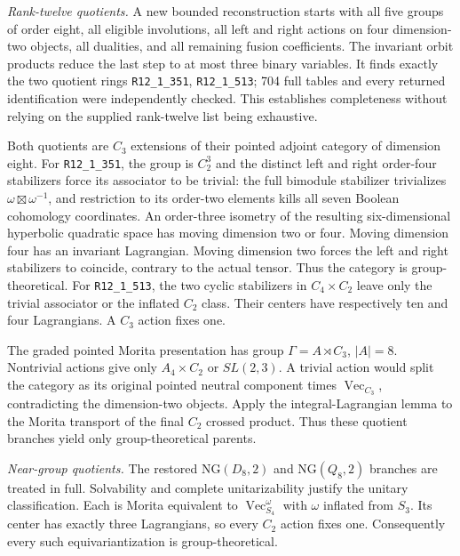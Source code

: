 \documentclass[11pt]{article}
\newcommand{\R}[1]{\texttt{R12\_1\_#1}}
\renewcommand{\Vec}{\operatorname{Vec}}
\begin{document}
\emph{Rank-twelve quotients.} A new bounded reconstruction starts with all
five groups of order eight, all eligible involutions, all left and right
actions on four dimension-two objects, all dualities, and all remaining
fusion coefficients. The invariant orbit products reduce the last step
to at most three binary variables. It finds exactly the two quotient
rings \R{351}, \R{513}; 704 full tables and every returned identification
were independently checked. This establishes completeness without relying
on the supplied rank-twelve list being exhaustive.

Both quotients are $C_3$ extensions of their pointed adjoint category of
dimension eight. For \R{351}, the group is $C_2^3$ and the distinct left
and right order-four stabilizers force its associator to be trivial:
the full bimodule stabilizer trivializes $\omega\boxtimes\omega^{-1}$,
and restriction to its order-two elements kills all seven Boolean
cohomology coordinates. An order-three isometry of the resulting
six-dimensional hyperbolic quadratic space has moving dimension two or
four. Moving dimension four has an invariant Lagrangian. Moving dimension
two forces the left and right stabilizers to coincide, contrary to the
actual tensor. Thus the category is group-theoretical. For \R{513},
the two cyclic stabilizers in $C_4\times C_2$ leave only the trivial
associator or the inflated $C_2$ class. Their centers have respectively
ten and four Lagrangians. A $C_3$ action fixes one.

The graded pointed Morita presentation has group $\Gamma=A\rtimes C_3$,
$|A|=8$. Nontrivial actions give only $A_4\times C_2$ or $SL(2,3)$.
A trivial action would split the category as its original pointed neutral
component times $\Vec_{C_3}$, contradicting the dimension-two objects.
Apply the integral-Lagrangian lemma to the Morita transport of the final
$C_2$ crossed product. Thus these quotient branches yield only
 group-theoretical parents.

\emph{Near-group quotients.} The restored $\mathrm{NG}(D_8,2)$ and
$\mathrm{NG}(Q_8,2)$ branches are treated in full. Solvability and complete
unitarizability justify the unitary classification. Each is Morita
equivalent to $\Vec_{S_4}^{\omega}$ with $\omega$ inflated from $S_3$.
Its center has exactly three Lagrangians, so every $C_2$ action fixes one.
Consequently every such equivariantization is group-theoretical.
\end{document}
